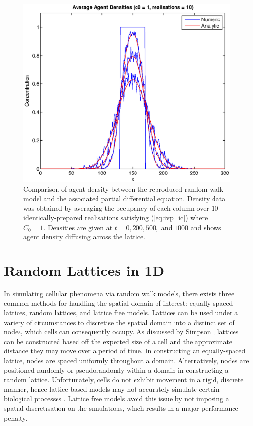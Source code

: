 \documentclass[11pt,a4paper]{article}
\begin{document}
			\begin{figure}[tbh]
				\centering
					\includegraphics[width=\textwidth]{./Figures/cell_concentration_1_10.eps}
				\caption{Comparison of agent density between the reproduced random walk model and the associated partial differential equation. Density data was obtained by averaging the occupancy of each column over 10 identically-prepared realisations satisfying (\ref{eq:ivp_ic}) where $C_0 = 1$. Densities are given at $t = 0, 200, 500,$ and $1000$ and shows agent density diffusing across the lattice.}
				\label{fig:cell_concentration_1_10}
			\end{figure}

	


\section{Random Lattices in 1D}
	\label{sec:randlatticein1d}
	
	In simulating cellular phenomena via random walk models, there exists three common methods for handling the spatial domain of interest: equally-spaced lattices, random lattices, and lattice free models. Lattices can be used under a variety of circumstances to discretise the spatial domain into a distinct set of nodes, which cells can consequently occupy. As discussed by Simpson \cite{simpson2010cell}, lattices can be constructed based off the expected size of a cell and the approximate distance they may move over a period of time. In constructing an equally-spaced lattice, nodes are spaced uniformly throughout a domain. Alternatively, nodes are positioned randomly or pseudorandomly within a domain in constructing a random lattice. Unfortunately, cells do not exhibit movement in a rigid, discrete manner, hence lattice-based models may not accurately simulate certain biological processes \cite{plank2013lattice}. Lattice free models avoid this issue by not imposing a spatial discretisation on the simulations, which results in a major performance penalty. 
\end{document}
